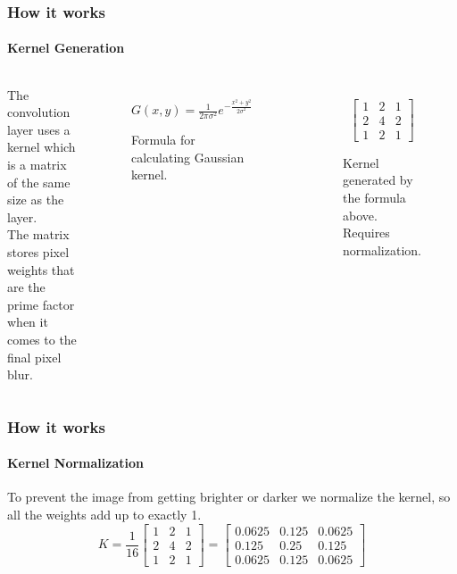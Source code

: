\documentclass[utf-8]{beamer}
\begin{document}
\begin{frame}
\frametitle{How it works}
\framesubtitle{Kernel Generation}
\begin{columns}
    \justifying
    The convolution layer uses a kernel which is a matrix of the same size as the layer.\\ \vspace{20px}
    The matrix stores pixel weights that are the prime factor when it comes to the final pixel blur.
    \begin{figure}
        \centering
        $G(x,y) = \frac{1}{2\pi\sigma^2} e^{-\frac{x^2 + y^2}{2\sigma^2}}$
        \caption{Formula for calculating Gaussian kernel.}
    \end{figure}
    \vspace{-20 px}
    \begin{figure}
    $$
    \begin{bmatrix}
    1 & 2 & 1 \\
    2 & 4 & 2 \\
    1 & 2 & 1
    \end{bmatrix}
    $$
    \caption{Kernel generated by the formula above. Requires normalization.}
    \end{figure}
    
\end{columns}
\end{frame}

\begin{frame}
\frametitle{How it works}
\framesubtitle{Kernel Normalization}
To prevent the image from getting brighter or darker we normalize the kernel,
so all the weights add up to exactly 1.
$$
K= \frac{1}{16} \begin{bmatrix}
    1 & 2 & 1 \\
    2 & 4 & 2 \\
    1 & 2 & 1
    \end{bmatrix}
    =
    \begin{bmatrix}
    0.0625 & 0.125 & 0.0625 \\
    0.125  & 0.25  & 0.125  \\
    0.0625 & 0.125 & 0.0625
    \end{bmatrix}
$$
\end{frame}
\end{document}
